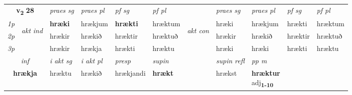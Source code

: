 \noindent
\begin{tabular}{lllllllllll} \toprule
\multicolumn{2}{c}{\textbf{v{\textsubscript{2}}} \Large{\textbf{28}}}  &  \textit{praes sg}  & \textit{praes pl}  &\textit{ pf sg} & \textit{pf pl} &  &  \textit{praes sg}  & \textit{praes pl}  & \textit{pf sg} & \textit{pf pl } \\*
	\cmidrule{3-6} \cmidrule{8-11}
 {\textit{1p}} & \multirow{3}{*}{\begin{turn}{90}\textit{akt ind}\end{turn}} & \textbf{hræki} & hrækjum & \textbf{hrækti} & hræktum & \multirow{3}{*}{\begin{turn}{90}\textit{akt con}\end{turn}} &hræki & hrækjum & hrækti & hræktum\\*
 {\textit{2p}} &  &  hrækir  & hrækið & hræktir & hræktuð & & hrækir & hrækið & hræktir & hræktuð \\*
{\textit{3p}} &  & hrækir & hrækja & hrækti & hræktu & & hræki & hræki& hrækti & hræktu \\*
\cmidrule{3-6} \cmidrule{8-11}

   \multicolumn{2}{c}{\textit{inf}}  & \textit{i akt sg} & \textit{i akt pl}   & \textit{presp} & \textit{supin} && \textit{supin refl} & \textit{pp m} \\*
  \multicolumn{2}{c}{\textbf{hrækja}} & hræktu  & hrækið   & hrækjandi &  \textbf{hrækt} && hrækst & \specialcell{\textbf{hræktur} \\ adj\textbf{\textsubscript{1-10}}} \\*
\end{tabular}

